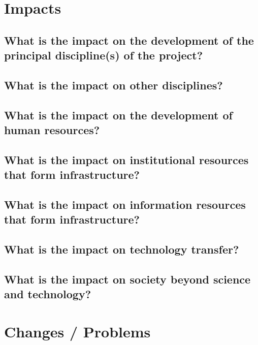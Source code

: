 \documentclass{article}
\begin{document}
\section*{Impacts}
\subsection*{What is the impact on the development of the principal discipline(s) of the project?}
\vspace{5mm}
\subsection*{What is the impact on other disciplines?}
\vspace{5mm}
\subsection*{What is the impact on the development of human resources?}
\vspace{5mm}
\subsection*{What is the impact on institutional resources that form infrastructure?}
\vspace{5mm}
\subsection*{What is the impact on information resources that form infrastructure?}
\vspace{5mm}
\subsection*{What is the impact on technology transfer?}
\vspace{5mm}
\subsection*{What is the impact on society beyond science and technology?}
\newpage
\section*{Changes / Problems}
\end{document}
